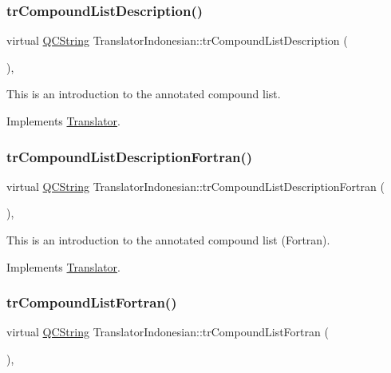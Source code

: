 \subsubsection{\texorpdfstring{trCompoundListDescription()}{trCompoundListDescription()}}
{\footnotesize\ttfamily virtual \mbox{\hyperlink{class_q_c_string}{Q\+C\+String}} Translator\+Indonesian\+::tr\+Compound\+List\+Description (\begin{DoxyParamCaption}{ }\end{DoxyParamCaption})\hspace{0.3cm}{\ttfamily [inline]}, {\ttfamily [virtual]}}

This is an introduction to the annotated compound list. 

Implements \mbox{\hyperlink{class_translator}{Translator}}.

\mbox{\label{class_translator_indonesian_a640a53af037adc22cc1cdc49700e950b}} 
\subsubsection{\texorpdfstring{trCompoundListDescriptionFortran()}{trCompoundListDescriptionFortran()}}
{\footnotesize\ttfamily virtual \mbox{\hyperlink{class_q_c_string}{Q\+C\+String}} Translator\+Indonesian\+::tr\+Compound\+List\+Description\+Fortran (\begin{DoxyParamCaption}{ }\end{DoxyParamCaption})\hspace{0.3cm}{\ttfamily [inline]}, {\ttfamily [virtual]}}

This is an introduction to the annotated compound list (Fortran). 

Implements \mbox{\hyperlink{class_translator}{Translator}}.

\mbox{\label{class_translator_indonesian_a4c7afa351c3e5f842da2d237e0485ee1}} 
\subsubsection{\texorpdfstring{trCompoundListFortran()}{trCompoundListFortran()}}
{\footnotesize\ttfamily virtual \mbox{\hyperlink{class_q_c_string}{Q\+C\+String}} Translator\+Indonesian\+::tr\+Compound\+List\+Fortran (\begin{DoxyParamCaption}{ }\end{DoxyParamCaption})\hspace{0.3cm}{\ttfamily [inline]}, {\ttfamily [virtual]}}

